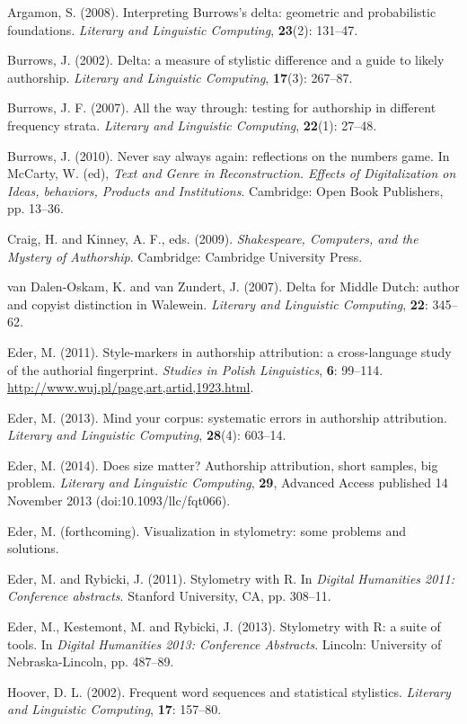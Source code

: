 \documentclass[11pt,a4paper]{article}
\begin{document}
Argamon, S. (2008). Interpreting Burrows’s delta: geometric and probabilistic
foundations. \textit{Literary and Linguistic Computing}, \textbf{23}(2):
131--47.

Burrows, J. (2002). Delta: a measure of stylistic difference and a
guide to likely authorship. \textit{Literary and Linguistic Computing},
\textbf{17}(3): 267--87.

Burrows, J. F. (2007). All the way through: testing for authorship
in different frequency strata. \textit{Literary and Linguistic Computing},
\textbf{22}(1): 27--48.

Burrows, J. (2010). Never say always again: reflections on the numbers
game. In McCarty, W. (ed), \textit{Text and Genre in Reconstruction.
Effects of Digitalization on Ideas, behaviors, Products and Institutions}.
Cambridge: Open Book Publishers, pp. 13--36.

Craig, H. and Kinney, A. F., eds. (2009). \textit{Shakespeare, Computers,
and the Mystery of Authorship}. Cambridge: Cambridge University Press.

van Dalen-Oskam, K. and van Zundert, J. (2007). Delta for Middle Dutch:
author and copyist distinction in Walewein. \textit{Literary and Linguistic
Computing}, \textbf{22}: 345–62.

Eder, M. (2011). Style-markers in authorship attribution: a cross-language
study of the authorial fingerprint. \textit{Studies in Polish Linguistics},
\textbf{6}: 99--114. \url{http://www.wuj.pl/page,art,artid,1923.html}.

Eder, M. (2013). Mind your corpus: systematic errors in authorship
attribution. \textit{Literary and Linguistic Computing}, 
\textbf{28}(4): 603--14.

Eder, M. (2014). Does size matter? Authorship attribution, short samples,
big problem. \textit{Literary and Linguistic Computing}, \textbf{29},
Advanced Access published 14 November 2013 (doi:10.1093/llc/fqt066).

Eder, M. (forthcoming). Visualization in stylometry: some problems and 
solutions.

Eder, M. and Rybicki, J. (2011). Stylometry with R. In \textit{Digital
Humanities 2011: Conference abstracts}. Stanford University, CA, pp.
308--11.

Eder, M., Kestemont, M. and Rybicki, J. (2013). Stylometry with R: a suite 
of tools. In \textit{Digital Humanities 2013: Conference Abstracts}. 
Lincoln: University of Nebraska-Lincoln, pp. 487--89.

Hoover, D. L. (2002). Frequent word sequences and statistical stylistics.
\textit{Literary and Linguistic Computing}, \textbf{17}: 157--80.
\end{document}
